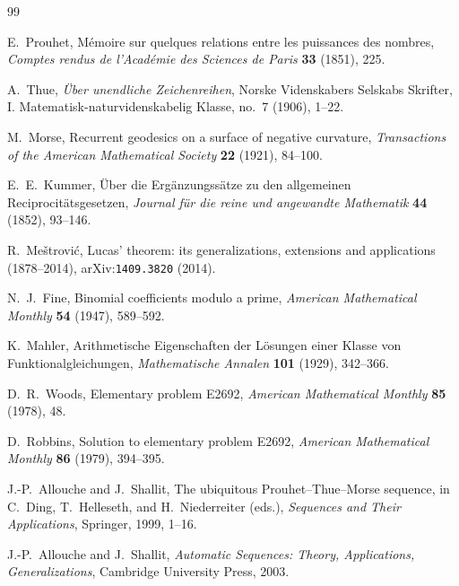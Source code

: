 \documentclass[11pt,oneside]{article}
\theoremstyle{definition}
\theoremstyle{remark}
\begin{document}
\begin{thebibliography}{99}

E.~Prouhet,
\newblock M\'emoire sur quelques relations entre les puissances des nombres,
\newblock \emph{Comptes rendus de l'Acad\'emie des Sciences de Paris}
  \textbf{33} (1851), 225.

A.~Thue,
\newblock \emph{\"Uber unendliche Zeichenreihen},
\newblock Norske Videnskabers Selskabs Skrifter, I. Matematisk-naturvidenskabelig
  Klasse, no.~7 (1906), 1--22.

M.~Morse,
\newblock Recurrent geodesics on a surface of negative curvature,
\newblock \emph{Transactions of the American Mathematical Society}
  \textbf{22} (1921), 84--100.

E.~E.~Kummer,
\newblock \"Uber die Erg\"anzungss\"atze zu den allgemeinen
  Reciprocit\"atsgesetzen,
\newblock \emph{Journal f\"ur die reine und angewandte Mathematik}
  \textbf{44} (1852), 93--146.

R.~Me\v{s}trovi\'c,
\newblock Lucas' theorem: its generalizations, extensions and applications
  (1878--2014),
\newblock arXiv:\nolinkurl{1409.3820} (2014).

N.~J.~Fine,
\newblock Binomial coefficients modulo a prime,
\newblock \emph{American Mathematical Monthly} \textbf{54} (1947), 589--592.

K.~Mahler,
\newblock Arithmetische Eigenschaften der L\"osungen einer Klasse von
  Funktionalgleichungen,
\newblock \emph{Mathematische Annalen} \textbf{101} (1929), 342--366.

D.~R.~Woods,
\newblock Elementary problem E2692,
\newblock \emph{American Mathematical Monthly} \textbf{85} (1978), 48.

D.~Robbins,
\newblock Solution to elementary problem E2692,
\newblock \emph{American Mathematical Monthly} \textbf{86} (1979), 394--395.

J.-P.~Allouche and J.~Shallit,
\newblock The ubiquitous Prouhet--Thue--Morse sequence,
\newblock in C.~Ding, T.~Helleseth, and H.~Niederreiter (eds.),
  \emph{Sequences and Their Applications}, Springer, 1999, 1--16.

J.-P.~Allouche and J.~Shallit,
\newblock \emph{Automatic Sequences: Theory, Applications, Generalizations},
\newblock Cambridge University Press, 2003.


\end{thebibliography}
\end{document}
